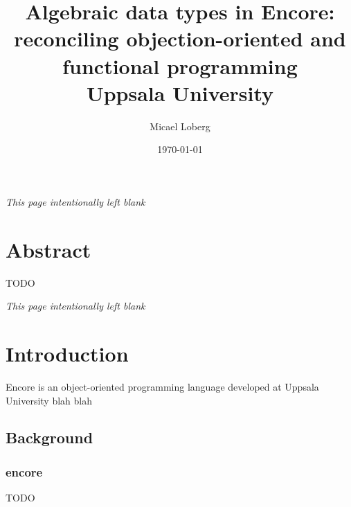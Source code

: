 \documentclass[10pt]{report}
\title{
    {Algebraic data types in Encore:}\\
    {reconciling objection-oriented and functional programming}\\
    {Uppsala University}
}
\author{Micael Loberg}
\date{\today}
\begin{document}

\maketitle

\newpage\newpage
{\centering \textit{This page intentionally left blank}\par}
\vspace{\fill}


\chapter*{Abstract}
TODO

\newpage\newpage
{\centering \textit{This page intentionally left blank}\par}
\vspace{\fill}


\tableofcontents

%
\chapter{Introduction}
Encore is an object-oriented programming language developed at Uppsala University blah blah
%
\setcounter{page}{1}

%
\section{Background}
\label{ch:background}
%

\subsection{encore}
TODO
\end{document}
